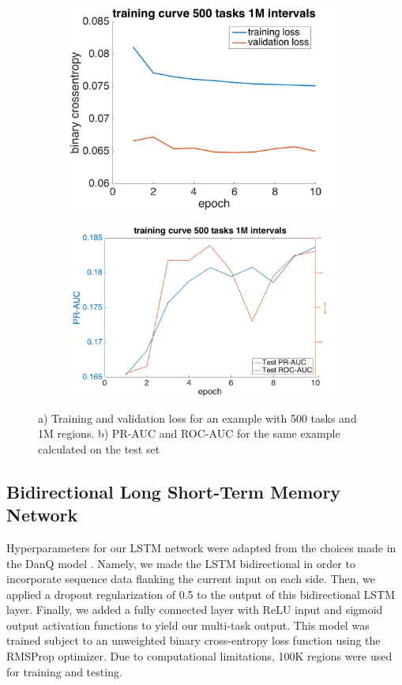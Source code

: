 \documentclass{article}
\begin{document}
\begin{figure}[h]
\begin{subfigure}[t]{0.47\textwidth}
\includegraphics[width=\textwidth]{figures/learning_curve.png}
\caption{}
\end{subfigure}
\begin{subfigure}[t]{0.55\textwidth}
\includegraphics[width=\textwidth]{figures/AUCs.png}
\caption{}
\end{subfigure}
\caption{a) Training and validation loss for an example with 500 tasks and 1M regions. b) PR-AUC and ROC-AUC for the same example calculated on the test set}
\label{fig:CNNlearningCurve}
\end{figure}

\subsection{Bidirectional Long Short-Term Memory Network}
Hyperparameters for our LSTM network were adapted from the choices made in the DanQ model \cite{quang2016danq}.  Namely, we made the LSTM bidirectional in order to incorporate sequence data flanking the current input on each side. Then, we applied a dropout regularization of 0.5 to the output of this bidirectional LSTM layer. Finally, we added a fully connected layer with ReLU input and sigmoid output activation functions to yield our multi-task output. This model was trained subject to an unweighted binary cross-entropy loss function using the RMSProp optimizer.  Due to computational limitations, 100K regions were used for training and testing.
\end{document}
